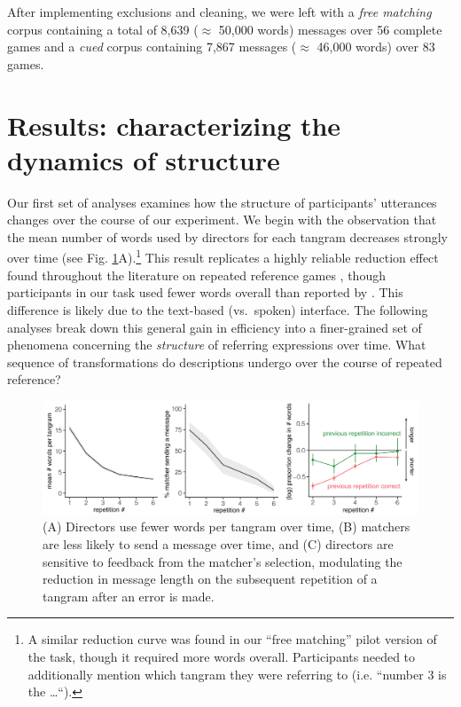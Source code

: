 \documentclass[alpha-refs]{wiley-article}
\begin{document}
\noindent After implementing exclusions and cleaning, we were left with a \emph{free matching} corpus containing a total of 8,639 ($\approx$ 50,000 words) messages over 56 complete games and a \emph{cued} corpus containing 7,867 messages ($\approx$ 46,000 words) over 83 games.


\section{Results: characterizing the dynamics of structure}
\label{sec:structure}

Our first set of analyses examines how the structure of participants' utterances changes over the course of our experiment.
We begin with the observation that the mean number of words used by directors for each tangram decreases strongly over time (see Fig. \ref{fig:feedback}A).\footnote{A similar reduction curve was found in our  ``free matching'' pilot version of the task, though it required more words overall. Participants needed to additionally mention which tangram they were referring to (i.e. ``number 3 is the \dots``).}
This result replicates a highly reliable reduction effect found throughout the literature on repeated reference games \citep[e.g.][]{KraussWeinheimer64_ReferencePhrases,BrennanClark96_ConceptualPactsConversation}, though participants in our task used fewer words overall than reported by \cite{ClarkWilkesGibbs86_ReferringCollaborative}.
This difference is likely due to the text-based (vs.~spoken) interface.
The following analyses break down this general gain in efficiency into a finer-grained set of phenomena concerning the \emph{structure} of referring expressions over time.
What sequence of transformations do descriptions undergo over the course of repeated reference?


\begin{figure}[t]
\centering
\includegraphics[scale=.64]{listenerFeedback_combined.pdf}
\caption{(A) Directors use fewer words per tangram over time, (B) matchers are less likely to send a message over time, and (C) directors are sensitive to feedback from the matcher's selection, modulating the reduction in message length on the subsequent repetition of a tangram after an error is made.}
\label{fig:feedback}
\end{figure}
\end{document}
